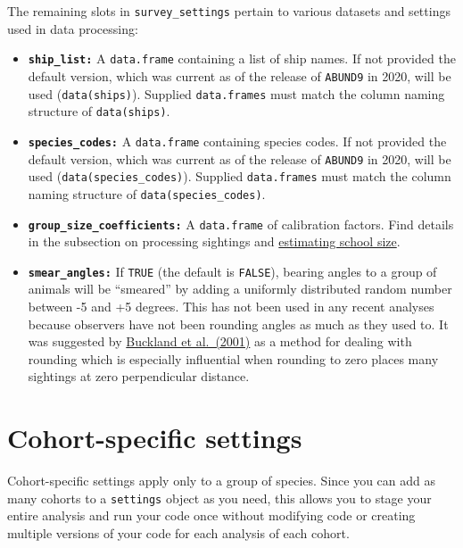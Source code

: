 \documentclass[
]{book}
\begin{document}
The remaining slots in \texttt{survey\_settings} pertain to various datasets and settings used in data processing:

\begin{itemize}
\item
  \textbf{\texttt{ship\_list:}} A \texttt{data.frame} containing a list of ship names. If not provided the default version, which was current as of the release of \texttt{ABUND9} in 2020, will be used (\texttt{data(ships)}). Supplied \texttt{data.frames} must match the column naming structure of \texttt{data(ships)}.
\item
  \textbf{\texttt{species\_codes:}} A \texttt{data.frame} containing species codes. If not provided the default version, which was current as of the release of \texttt{ABUND9} in 2020, will be used (\texttt{data(species\_codes)}). Supplied \texttt{data.frames} must match the column naming structure of \texttt{data(species\_codes)}.
\item
  \textbf{\texttt{group\_size\_coefficients:}} A \texttt{data.frame} of calibration factors. Find details in the subsection on processing sightings and \protect\hyperlink{ss_calibration}{estimating school size}.
\item
  \textbf{\texttt{smear\_angles:}} If \texttt{TRUE} (the default is \texttt{FALSE}), bearing angles to a group of animals will be ``smeared'' by adding a uniformly distributed random number between -5 and +5 degrees. This has not been used in any recent analyses because observers have not been rounding angles as much as they used to. It was suggested by \href{https://distancesampling.org/whatisds.html\#books}{Buckland et al.~(2001)} as a method for dealing with rounding which is especially influential when rounding to zero places many sightings at zero perpendicular distance.
\end{itemize}

\hypertarget{cohort-specific-settings}{%
\section*{Cohort-specific settings}\label{cohort-specific-settings}}

Cohort-specific settings apply only to a group of species. Since you can add as many cohorts to a \texttt{settings} object as you need, this allows you to stage your entire analysis and run your code once without modifying code or creating multiple versions of your code for each analysis of each cohort.
\end{document}
